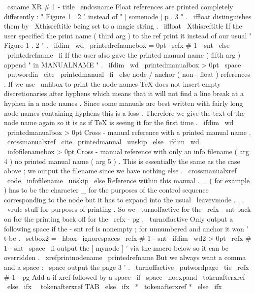 {{{{{{\
csname
XR
#
1
-
title
\
endcsname
}
%
%
%
Float
references
are
printed
completely
differently
:
"
Figure
1
.
2
"
%
instead
of
"
[
somenode
]
p
.
3
"
.
\
iffloat
distinguishes
them
by
%
\
Xthisreftitle
being
set
to
a
magic
string
.
\
iffloat
\
Xthisreftitle
%
If
the
user
specified
the
print
name
(
third
arg
)
to
the
ref
%
print
it
instead
of
our
usual
"
Figure
1
.
2
"
.
\
ifdim
\
wd
\
printedrefnamebox
=
0pt
\
refx
{
#
1
-
snt
}
{
}
%
\
else
\
printedrefname
\
fi
%
%
If
the
user
also
gave
the
printed
manual
name
(
fifth
arg
)
append
%
"
in
MANUALNAME
"
.
\
ifdim
\
wd
\
printedmanualbox
>
0pt
\
space
\
putwordin
{
}
\
cite
{
\
printedmanual
}
%
\
fi
\
else
%
node
/
anchor
(
non
-
float
)
references
.
%
%
If
we
use
\
unhbox
to
print
the
node
names
TeX
does
not
insert
%
empty
discretionaries
after
hyphens
which
means
that
it
will
not
%
find
a
line
break
at
a
hyphen
in
a
node
names
.
Since
some
manuals
%
are
best
written
with
fairly
long
node
names
containing
hyphens
%
this
is
a
loss
.
Therefore
we
give
the
text
of
the
node
name
%
again
so
it
is
as
if
TeX
is
seeing
it
for
the
first
time
.
%
\
ifdim
\
wd
\
printedmanualbox
>
0pt
%
Cross
-
manual
reference
with
a
printed
manual
name
.
%
\
crossmanualxref
{
\
cite
{
\
printedmanual
\
unskip
}
}
%
%
\
else
\
ifdim
\
wd
\
infofilenamebox
>
0pt
%
Cross
-
manual
reference
with
only
an
info
filename
(
arg
4
)
no
%
printed
manual
name
(
arg
5
)
.
This
is
essentially
the
same
as
%
the
case
above
;
we
output
the
filename
since
we
have
nothing
else
.
%
\
crossmanualxref
{
\
code
{
\
infofilename
\
unskip
}
}
%
%
\
else
%
Reference
within
this
manual
.
%
%
_
(
for
example
)
has
to
be
the
character
_
for
the
purposes
of
the
%
control
sequence
corresponding
to
the
node
but
it
has
to
expand
%
into
the
usual
\
leavevmode
.
.
.
\
vrule
stuff
for
purposes
of
%
printing
.
So
we
\
turnoffactive
for
the
\
refx
-
snt
back
on
for
the
%
printing
back
off
for
the
\
refx
-
pg
.
{
\
turnoffactive
%
Only
output
a
following
space
if
the
-
snt
ref
is
nonempty
;
for
%
unnumbered
and
anchor
it
won
'
t
be
.
\
setbox2
=
\
hbox
{
\
ignorespaces
\
refx
{
#
1
-
snt
}
{
}
}
%
\
ifdim
\
wd2
>
0pt
\
refx
{
#
1
-
snt
}
\
space
\
fi
}
%
%
output
the
[
mynode
]
'
via
the
macro
below
so
it
can
be
overridden
.
\
xrefprintnodename
\
printedrefname
%
%
But
we
always
want
a
comma
and
a
space
:
\
space
%
%
output
the
page
3
'
.
\
turnoffactive
\
putwordpage
\
tie
\
refx
{
#
1
-
pg
}
{
}
%
%
Add
a
if
xref
followed
by
a
space
\
if
\
space
\
noexpand
\
tokenafterxref
%
\
else
\
ifx
\
\
tokenafterxref
%
TAB
\
else
\
ifx
\
*
\
tokenafterxref
%
*
\
else
\
ifx
\
}}}}}
